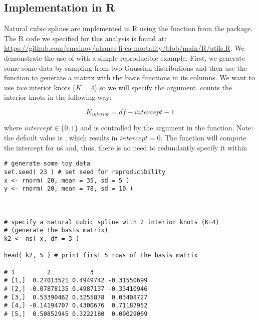 \documentclass{article}
\begin{document}
\subsection*{\textbf{Implementation in R}} %
\hspace{\parindent} Natural cubic splines are implemented in R using the {} function from the {} package. The R code we specified for this analysis is found at: \textcolor{blue}{\url{https://github.com/cmainov/nhanes-fi-ca-mortality/blob/main/R/utils.R}}. We demonstrate the use of {} with a simple reproducible example. First, we generate some some data by sampling from two Gaussian distributions and then use the {} function to generate a matrix with the basis functions in its columns. We want to use \textit{two} interior knots ($K=4$) so we will specify the {} argument.  {} counts the interior knots in the following way:

$$K_{interior}=df-intercept-1$$

\noindent where $intercept \in \{0,1\}$ and is controlled by the {} argument in the {} function. Note: the default value is {}, which results in $intercept=0$. The {} function will compute the intercept for us and, thus, there is no need to redundantly specify it within {} 
 
 \vspace{0.7cm}
 
\begin{lstlisting}
# generate some toy data
set.seed( 23 ) # set seed for reproducibility 
x <- rnorm( 20, mean = 35, sd = 5 )
y <- rnorm( 20, mean = 78, sd = 10 )



# specify a natural cubic spline with 2 interior knots (K=4)
# (generate the basis matrix)
k2 <- ns( x, df = 3 )

head( k2, 5 ) # print first 5 rows of the basis matrix

# 1         2           3
# [1,]  0.27013521 0.4949742 -0.31550699
# [2,] -0.07878135 0.4987137 -0.33410946
# [3,]  0.53390462 0.3255878  0.03408727
# [4,] -0.14194707 0.4300676  0.71187952
# [5,]  0.50852945 0.3222180  0.09029069

\end{lstlisting}

 \vspace{0.5cm}
 
\end{document}
